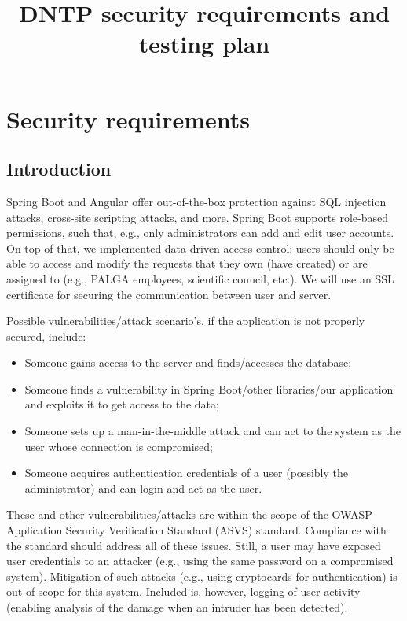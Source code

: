 \documentclass[a4paper]{report}
\title{DNTP security requirements and testing plan}
\begin{document}
\maketitle

\chapter{Security requirements}

\section{Introduction}

Spring Boot and Angular offer out-of-the-box protection against SQL injection attacks, cross-site scripting attacks, and more.
Spring Boot supports role-based permissions, such that, e.g., only administrators can add and edit user accounts. On top of that, we implemented data-driven access control: users should only be able to access and modify the requests that they own (have created) or are assigned to (e.g., PALGA employees, scientific council, etc.).
We will use an SSL certificate for securing the communication between user and server.

Possible vulnerabilities/attack scenario's, if the application is not properly secured, include:
\begin{itemize}
\item Someone gains access to the server and finds/accesses the database;
\item Someone finds a vulnerability in Spring Boot/other libraries/our application and exploits it to get access to the data;
\item Someone sets up a man-in-the-middle attack and can act to the system as the user whose connection is compromised;
\item Someone acquires authentication credentials of a user (possibly the administrator) and can login and act as the user.
\end{itemize}
These and other vulnerabilities/attacks are within the scope of the OWASP Application Security Verification Standard (ASVS) standard. Compliance with the standard should address all of these issues.
Still, a user may have exposed user credentials to an attacker (e.g., using the same password on a compromised system). Mitigation of such attacks (e.g., using cryptocards for authentication) is out of scope for this system. Included is, however, logging of user activity (enabling analysis of the damage when an intruder has been detected).
\end{document}
